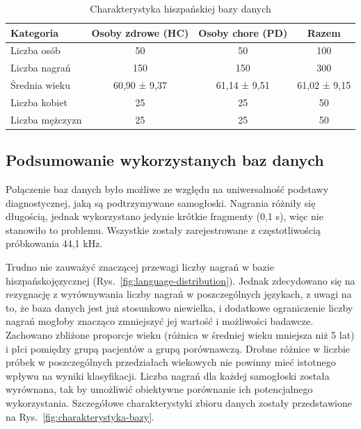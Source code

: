 \begin{table}[ht]
\centering
\caption{Charakterystyka hiszpańskiej bazy danych}
\label{tab:spanish-database}
\begin{tabular}{|l|c|c|c|}
\hline
\textbf{Kategoria} &\textbf{Osoby zdrowe (HC)} &\textbf{Osoby chore (PD)} &\textbf{Razem} \\ \hline
Liczba osób &50 &50 &100\\ \hline
Liczba nagrań &150 &150 &300\\ \hline
Średnia wieku &60,90 ± 9,37 &61,14 ± 9,51  &61,02 ± 9,15\\ \hline
Liczba kobiet &25 &25 &50\\ \hline
Liczba mężczyzn &25 &25 &50 \\ \hline
\end{tabular}
\end{table}

\subsection{Podsumowanie wykorzystanych baz danych}
\label{subsec:podsumowanie-baz}

Połączenie baz danych było możliwe ze względu na uniwersalność podstawy diagnostycznej, jaką są podtrzymywane samogłoski.
Nagrania różniły się długością, jednak wykorzystano jedynie krótkie fragmenty (0,1 s), więc nie stanowiło to problemu.
Wszystkie zostały zarejestrowane z częstotliwością próbkowania 44,1 kHz.

Trudno nie zauważyć znaczącej przewagi liczby nagrań w bazie hiszpańskojęzycznej (Rys.~\ref{fig:language-distribution}).
Jednak zdecydowano się na rezygnację z wyrównywania liczby nagrań w poszczególnych językach, z uwagi na to, że baza danych jest już stosunkowo niewielka, i dodatkowe ograniczenie liczby nagrań mogłoby znacząco zmniejszyć jej wartość i możliwości badawcze.
Zachowano zbliżone proporcje wieku (różnica w średniej wieku mniejsza niż 5 lat) i płci pomiędzy grupą pacjentów a grupą porównawczą.
Drobne różnice w liczbie próbek w poszczególnych przedziałach wiekowych nie powinny mieć istotnego wpływu na wyniki klasyfikacji.
Liczba nagrań dla każdej samogłoski została wyrównana, tak by umożliwić obiektywne porównanie ich potencjalnego wykorzystania.
Szczegółowe charakterystyki zbioru danych zostały przedstawione na Rys.~\ref{fig:charakterystyka-bazy}.


